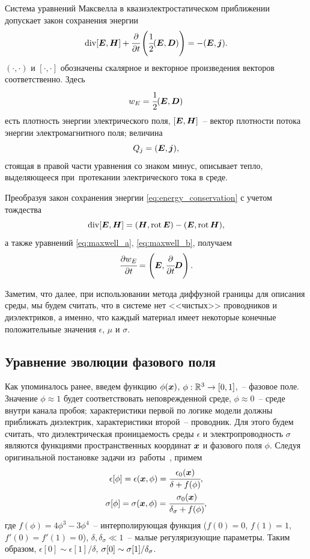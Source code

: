 Система уравнений Максвелла в квазиэлектростатическом приближении допускает закон сохранения энергии
\begin{equation}
    \operatorname{{div}} [{\boldsymbol{E}}, \boldsymbol{H}] + \cfrac{\partial }{\partial t} \left( \cfrac{1}{2} ({\boldsymbol{E}}, {\boldsymbol{D}}) \right) = -({\boldsymbol{E}}, {\boldsymbol{j}}).
    \label{eq:energy_conservation}
\end{equation}
$(\cdot, \cdot)$ и $[\cdot, \cdot]$ обозначены скалярное и векторное произведения векторов соответственно. Здесь
\begin{equation}
    w_E = \cfrac{1}{2} ({\boldsymbol{E}}, {\boldsymbol{D}})
    \label{eq:energy_density_electrical}
\end{equation}
есть плотность энергии электрического поля, $[{\boldsymbol{E}}, \boldsymbol{H}]$~-- вектор плотности потока энергии электромагнитного поля; величина
\begin{equation}
    Q_j = ({\boldsymbol{E}}, {\boldsymbol{j}}),
    \label{eq:heat}
\end{equation}
стоящая в правой части уравнения со знаком минус, описывает тепло, выделяющееся при~протекании электрического тока в среде.

Преобразуя закон сохранения энергии \eqref{eq:energy_conservation} с учетом тождества
\[
    \operatorname{{div}}[{\boldsymbol{E}}, \boldsymbol{H}] = (\boldsymbol{H}, \operatorname{{rot}} {\boldsymbol{E}}) - ({\boldsymbol{E}}, \operatorname{{rot}} \boldsymbol{H}),
\]
а также уравнений \eqref{eq:maxwell_a}, \eqref{eq:maxwell_b}, получаем
\[
    \cfrac{\partial w_E}{\partial t} = \left( {\boldsymbol{E}}, \cfrac{\partial }{\partial t} {\boldsymbol{D}} \right).
\]

Заметим, что далее, при использовании метода диффузной границы для описания среды, мы будем считать, что в системе нет <<чистых>> проводников и диэлектриков, а именно, что каждый материал имеет некоторые конечные положительные значения $\epsilon$, $\mu$ и $\sigma$.


\subsection{Уравнение эволюции фазового поля}
\label{ssec:phase_field_equation}

Как упоминалось ранее, введем функцию $\phi({\boldsymbol{x}})$, $\phi: {\mathbb{R}}^3 \to [0, 1]$,~-- фазовое поле. Значение $\phi \approx 1$ будет соответствовать неповрежденной среде, $\phi \approx 0$~-- среде внутри канала пробоя; характеристики первой по логике модели должны приближать диэлектрик, характеристики второй~-- проводник. Для этого будем считать, что диэлектрическая проницаемость среды $\epsilon$ и электропроводность $\sigma$ являются функциями пространственных координат ${\boldsymbol{x}}$ и фазового поля $\phi$. Следуя оригинальной постановке задачи из~работы~\cite{pitike_dielectric_breakdown}, примем
{
\allowdisplaybreaks
\begin{gather}
    \epsilon[\phi] = \epsilon({\boldsymbol{x}}, \phi) = \cfrac{\epsilon_0({\boldsymbol{x}})}{\delta + f(\phi)},
    \label{eq:epsilon} \\
    \sigma[\phi] = \sigma({\boldsymbol{x}}, \phi) = \cfrac{\sigma_0({\boldsymbol{x}})}{\delta_\sigma + f(\phi)},
    \nonumber
\end{gather}
}
где $f(\phi) = 4 \phi^3 - 3 \phi^4$~-- интерполирующая функция ($f(0) = 0$, $f(1) = 1$, $f'(0) = f'(1) = 0$), $\delta, \delta_\sigma \ll 1$~-- малые регуляризующие параметры. Таким образом, $\epsilon[0] \sim \epsilon[1] / \delta$, $\sigma[0] \hm \sim \sigma[1] / \delta_\sigma$.

